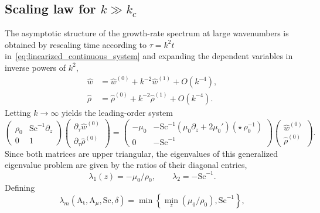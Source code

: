 \documentclass[11pt]{article}
\newcommand{\Atw}{\mathrm{A_t}}
\newcommand{\Sch}{\mathrm{Sc}}
\begin{document}
\subsection{Scaling law for \texorpdfstring{\( k \gg k_c \)}{k >> kc}}
\label{subsec:kggkc}
The asymptotic structure of the growth-rate spectrum at large wavenumbers is obtained by rescaling time according to \(\tau = k^{2}t\) in~\eqref{eq:linearized_continuous_system} and expanding the dependent variables in inverse powers of \(k^{2}\),
\begin{subequations}
\begin{align}
    \hat{w} &= \hat{w}^{(0)} + k^{-2}\hat{w}^{(1)} + O\!\left(k^{-4}\right), \\
    \hat{\rho} &= \hat{\rho}^{(0)} + k^{-2}\hat{\rho}^{(1)} + O\!\left(k^{-4}\right).
\end{align}
\end{subequations}
Letting \(k\to\infty\) yields the leading-order system
\begin{equation}
    \begin{pmatrix}
        \rho_0 & \Sch^{-1}\partial_z \\[4pt]
        0 & 1
    \end{pmatrix}
    \begin{pmatrix}
        \partial_\tau \hat{w}^{(0)}\\[4pt]
        \partial_\tau \hat{\rho}^{(0)}
    \end{pmatrix}
    =
    \begin{pmatrix}
        -\mu_0 & -\Sch^{-1}\left(\mu_0\partial_z + 2\mu_0'\right)\left(\star\,\rho_0^{-1}\right)\\[6pt]
        0 & -\Sch^{-1}
    \end{pmatrix}
    \begin{pmatrix}
        \hat{w}^{(0)}\\[4pt]
        \hat{\rho}^{(0)}
    \end{pmatrix}.
\end{equation}
Since both matrices are upper triangular, the eigenvalues of this generalized eigenvalue problem are given by the ratios of their diagonal entries,
\begin{equation}
    \lambda_1(z) = -\mu_0/\rho_0, \qquad \lambda_2 = -\Sch^{-1}.
\end{equation}
Defining
\begin{equation}
    \label{eq:theoretical_kgg1_lambdam}
    \lambda_m(\Atw,\mathrm{A}_{\mu},\Sch,\delta)
    =
    \min\left\{
        \min_{z}\!\left(\mu_0/\rho_0\right),
        \Sch^{-1}
    \right\},
\end{equation}
\end{document}
